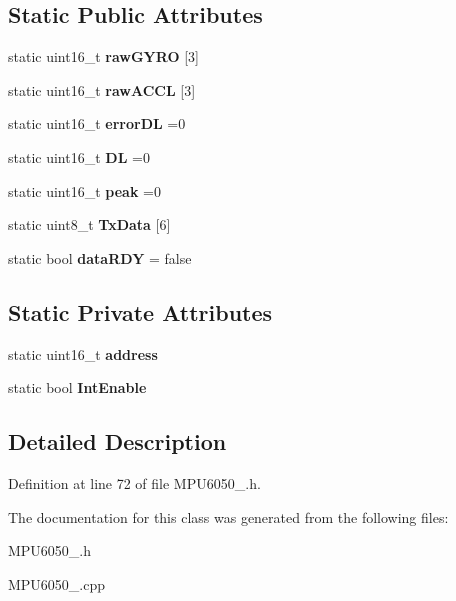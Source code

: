 \subsection*{Static Public Attributes}
\begin{DoxyCompactItemize}
\item 
\mbox{\label{classSensor_1_1MPU6050_a9e1b7e7fae58eda13a4a01dace4dce31}} 
static uint16\+\_\+t {\bfseries raw\+G\+Y\+RO} \mbox{[}3\mbox{]}
\item 
\mbox{\label{classSensor_1_1MPU6050_ac65f4884966872a95ed292a86419be41}} 
static uint16\+\_\+t {\bfseries raw\+A\+C\+CL} \mbox{[}3\mbox{]}
\item 
\mbox{\label{classSensor_1_1MPU6050_a23ca89d6631e30ffe5bc70196f991bba}} 
static uint16\+\_\+t {\bfseries error\+DL} =0
\item 
\mbox{\label{classSensor_1_1MPU6050_a0a14bd353bb0ef0828c8a97a31759c9f}} 
static uint16\+\_\+t {\bfseries DL} =0
\item 
\mbox{\label{classSensor_1_1MPU6050_ad3fcb168d63e452bfa871672a10ea27b}} 
static uint16\+\_\+t {\bfseries peak} =0
\item 
\mbox{\label{classSensor_1_1MPU6050_a0824a5a6c37256c078dd861fbe5678f6}} 
static uint8\+\_\+t {\bfseries Tx\+Data} \mbox{[}6\mbox{]}
\item 
\mbox{\label{classSensor_1_1MPU6050_a8f379aeb0bbbc448d9393419ac489e94}} 
static bool {\bfseries data\+R\+DY} = false
\end{DoxyCompactItemize}
\subsection*{Static Private Attributes}
\begin{DoxyCompactItemize}
\item 
\mbox{\label{classSensor_1_1MPU6050_a8014d9dbc6b1671decf74e9deddb8ad3}} 
static uint16\+\_\+t {\bfseries address}
\item 
\mbox{\label{classSensor_1_1MPU6050_a416da3b52ff7bf4c151b26f7c4c31d23}} 
static bool {\bfseries Int\+Enable}
\end{DoxyCompactItemize}


\subsection{Detailed Description}


Definition at line 72 of file M\+P\+U6050\+\_\+.\+h.



The documentation for this class was generated from the following files\+:\begin{DoxyCompactItemize}
\item 
M\+P\+U6050\+\_\+.\+h\item 
M\+P\+U6050\+\_\+.\+cpp\end{DoxyCompactItemize}

